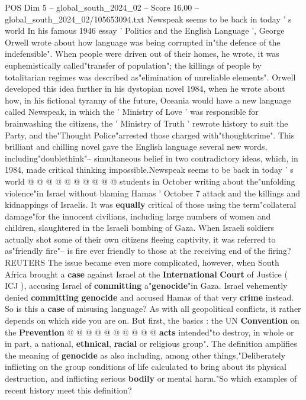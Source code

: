 \begin{textsample}{POS Dim 5 – global\_south\_2024\_02 – Score 16.00 – global\_south\_2024\_02/105653094.txt}  \label{ex:f5_pos_191}
Newspeak seems to be back in today ' s world In his famous 1946 essay ' Politics and the English Language ', George Orwell wrote about how language was being corrupted in"the defence of the indefensible".
When people were driven out of their homes, he wrote, it was euphemistically called"transfer of population"; the killings of people by totalitarian regimes was described as"elimination of unreliable elements".
Orwell developed this idea further in his dystopian novel 1984, when he wrote about how, in his fictional tyranny of the future, Oceania would have a new language called Newspeak, in which the ' Ministry of Love ' was responsible for brainwashing the citizens, the ' Ministry of Truth ' rewrote history to suit the Party, and the"Thought Police"arrested those charged with"thoughtcrime".
This brilliant and chilling novel gave the English language several new words, including"doublethink"-- simultaneous belief in two contradictory ideas, which, in 1984, made critical thinking impossible.Newspeak seems to be back in today ' s world @ @ @ @ @ @ @ @ @ @ students in October writing about the"unfolding violence"in Israel without blaming Hamas ' October 7 attack and the killings and kidnappings of Israelis.
It was \textbf{equally} critical of those using the term"collateral damage"for the innocent civilians, including large numbers of women and children, slaughtered in the Israeli bombing of Gaza.
When Israeli soldiers actually shot some of their own citizens fleeing captivity, it was referred to as"friendly fire"-- is fire ever friendly to those at the receiving end of the firing?
REUTERS The issue became even more complicated, however, when South Africa brought a \textbf{case} against Israel at the \textbf{International} \textbf{Court} of Justice ( ICJ ), accusing Israel of \textbf{committing} a"\textbf{genocide}"in Gaza.
Israel vehemently denied \textbf{committing} \textbf{genocide} and accused Hamas of that very \textbf{crime} instead.
So is this a \textbf{case} of misusing language?
As with all geopolitical conflicts, it rather depends on which side you are on.
But first, the basics : the UN \textbf{Convention} on the \textbf{Prevention} @ @ @ @ @ @ @ @ @ @ \textbf{acts} intended"to destroy, in whole or in part, a national, \textbf{ethnical}, \textbf{racial} or religious group".
The definition amplifies the meaning of \textbf{genocide} as also including, among other things,"Deliberately inflicting on the group conditions of life calculated to bring about its physical destruction, and inflicting serious \textbf{bodily} or mental harm."So which examples of recent history meet this definition?

\end{textsample}
